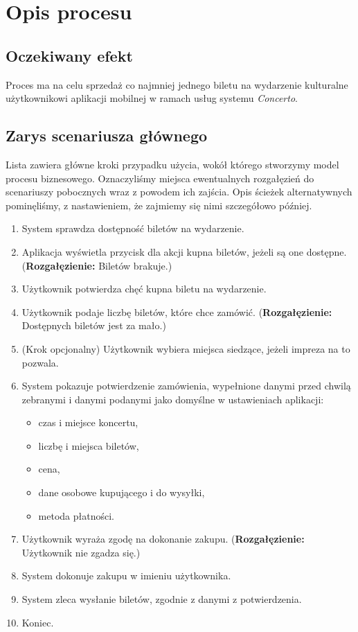 \section{Opis procesu}

\subsection{Oczekiwany efekt}
Proces ma na celu sprzedaż co najmniej jednego biletu na wydarzenie kulturalne
użytkownikowi aplikacji mobilnej w ramach usług systemu \emph{Concerto}.

\subsection{Zarys scenariusza głównego}
Lista zawiera główne kroki przypadku użycia, wokół którego stworzymy model
procesu biznesowego. Oznaczyliśmy miejsca ewentualnych rozgałęzień do
scenariuszy pobocznych wraz z powodem ich zajścia. Opis ścieżek alternatywnych
pominęliśmy, z nastawieniem, że zajmiemy się nimi szczegółowo później.
\begin{enumerate}[noitemsep]
    \item System sprawdza dostępność biletów na wydarzenie.
    \item Aplikacja wyświetla przycisk dla akcji kupna biletów, jeżeli są one
        dostępne. (\textbf{Rozgałęzienie:} Biletów brakuje.)
    \item Użytkownik potwierdza chęć kupna biletu na wydarzenie.
    \item Użytkownik podaje liczbę biletów, które chce zamówić.
        (\textbf{Rozgałęzienie:} Dostępnych biletów jest za mało.)
    \item (Krok opcjonalny) Użytkownik wybiera miejsca siedzące, jeżeli impreza
        na to pozwala.
    \item System pokazuje potwierdzenie zamówienia, wypełnione danymi przed
        chwilą zebranymi i danymi podanymi jako domyślne w ustawieniach
        aplikacji:
        \begin{itemize}[nosep]
            \item czas i miejsce koncertu,
            \item liczbę i miejsca biletów,
            \item cena,
            \item dane osobowe kupującego i do wysyłki,
            \item metoda płatności.
        \end{itemize}
    \item Użytkownik wyraża zgodę na dokonanie zakupu. (\textbf{Rozgałęzienie:}
        Użytkownik nie zgadza się.)
    \item System dokonuje zakupu w imieniu użytkownika.
    \item System zleca wysłanie biletów, zgodnie z danymi z potwierdzenia.
    \item Koniec.
\end{enumerate}
